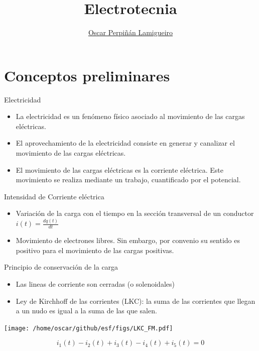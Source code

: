 \documentclass[xcolor={usenames,svgnames,dvipsnames}]{beamer}
\author{\href{https://oscarperpinan.github.io}{Oscar Perpiñán Lamigueiro}}
\date{}
\title{Electrotecnia}
\institute[UPM]{Universidad Politécnica de Madrid}
\begin{document}
\maketitle

\section{Conceptos preliminares}
\label{sec:orgaed72ff}

\begin{frame}[label={sec:org70cff09}]{Electricidad}
\begin{itemize}
\item La electricidad es un fenómeno físico asociado al \alert{movimiento de las
cargas eléctricas}.

\item El aprovechamiento de la electricidad consiste en generar y canalizar
el movimiento de las cargas eléctricas.

\item El movimiento de las cargas eléctricas es la \alert{corriente eléctrica}.
Este movimiento se realiza mediante un trabajo, cuantificado por el
\alert{potencial}.
\end{itemize}
\end{frame}

\begin{frame}[label={sec:org7ccdcc0}]{Intensidad de Corriente eléctrica}
\begin{itemize}
\item \alert{Variación de la carga con el tiempo en la sección transversal de un
conductor} \(i(t)=\frac{dq(t)}{dt}\)

\item Movimiento de electrones libres. Sin embargo, por convenio su sentido
es positivo para el movimiento de las cargas positivas.
\end{itemize}
\end{frame}

\begin{frame}[label={sec:org967d697}]{Principio de conservación de la carga}
\begin{itemize}
\item Las lineas de corriente son cerradas (o solenoidales)

\item \alert{Ley de Kirchhoff de las corrientes (LKC)}: la suma de las corrientes
que llegan a un nudo es igual a la suma de las que salen.
\end{itemize}

\begin{center}
\texttt{[image: /home/oscar/github/esf/figs/LKC\_FM.pdf]}
\end{center}

\[
i_1(t) - i_2(t) + i_3(t) - i_4(t) + i_5(t) = 0
\]
\end{frame}
\end{document}
